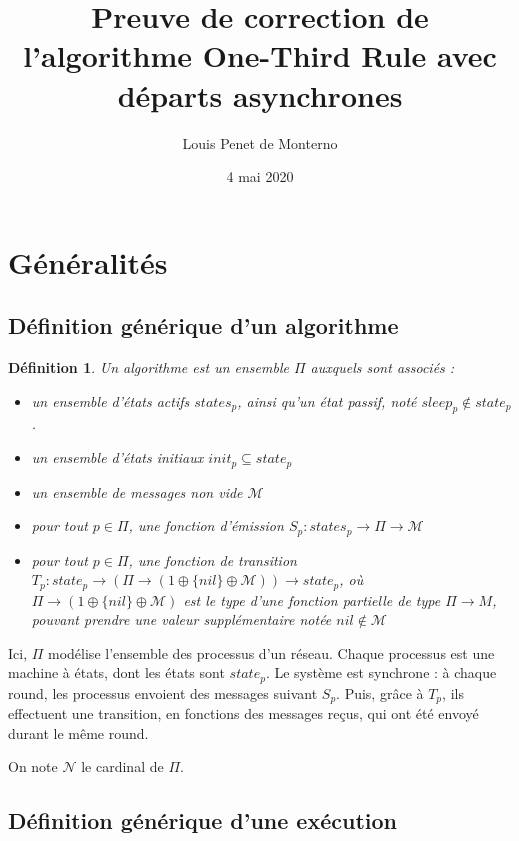 \documentclass{article}
\title{Preuve de correction de l'algorithme One-Third Rule avec départs asynchrones}
\date{4 mai 2020}
\author{Louis Penet de Monterno}
\newtheorem{definition}{Définition}
\begin{document}
\maketitle
  
\section{Généralités}

\subsection{Définition générique d'un algorithme}

\begin{definition}

Un algorithme est un ensemble $\Pi$ auxquels sont associés :

\begin{itemize}

  \item un ensemble d'états actifs $states_p$, ainsi qu'un état passif, noté $sleep_p \notin state_p$.
  \item un ensemble d'états initiaux  $init_p \subseteq state_p$
  \item un ensemble de messages non vide $\mathcal{M}$
  \item pour tout $p \in \Pi$, une fonction d'émission
	  $S_p : states_p \rightarrow \Pi \rightarrow \mathcal{M}$
  \item pour tout $p \in \Pi$, une fonction de transition
	  $T_p : state_p \rightarrow (\Pi \rightarrow (1 \oplus \{ nil \} \oplus \mathcal{M}))
	  \rightarrow state_p$,
	  où $\Pi \rightarrow (1 \oplus \{ nil \} \oplus \mathcal{M})$ est le type d'une fonction partielle
		de type $\Pi \rightarrow M$, pouvant prendre une valeur supplémentaire notée $nil \notin \mathcal{M}$

\end{itemize}
\end{definition}

Ici, $\Pi$ modélise l'ensemble des processus d'un réseau. Chaque processus est une machine à états, dont les états sont $state_p$.
Le système est synchrone : à chaque round, les processus envoient des messages suivant $S_p$. Puis, grâce à $T_p$, ils effectuent une transition,
en fonctions des messages reçus, qui ont été envoyé durant le même round.

On note $\mathcal{N}$ le cardinal de $\Pi$.

\subsection{Définition générique d'une exécution}
\end{document}
